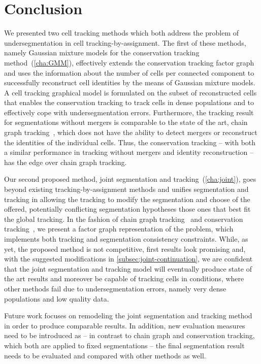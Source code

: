 \chapter{Conclusion}
\label{cha:conclusion}
We presented two cell tracking methods which both address the problem of undersegmentation in cell
tracking-by-assignment. The first of these methods, namely Gaussian mixture models for the
conservation tracking method~(\cref{cha:GMM}), effectively extends the conservation tracking factor
graph and uses the information about the number of cells per connected component to successfully
reconstruct cell identities by the means of Gaussian mixture models. A cell tracking graphical model
is formulated on the subset of reconstructed cells that enables the conservation tracking to track
cells in dense populations and to effectively cope with undersegmentation errors. Furthermore, the
tracking result for segmentations without mergers is comparable to the state of the art, chain graph
tracking~\citep{kausler_12_discrete}, which does not have the ability to detect mergers or
reconstruct the identities of the individual cells. Thus, the conservation tracking -- with both a
similar performance in tracking without mergers and identity reconstruction -- has the edge over
chain graph tracking.

Our second proposed method, joint segmentation and tracking~(\cref{cha:joint}), goes beyond existing
tracking-by-assignment methods and unifies segmentation and tracking in allowing the tracking to
modify the segmentation and choose of the offered, potentially conflicting segmentation hypotheses
those ones that best fit the global tracking. In the fashion of chain graph
tracking~\citep{kausler_12_discrete} and conservation tracking~\citep{schiegg_13_conservation}, we
present a factor graph representation of the problem, which implements both tracking and
segmentation consistency constraints. While, as yet, the proposed method is not competitive, first
results look promising and, with the suggested modifications in \cref{subsec:joint-continuation}, we
are confident that the joint segmentation and tracking model will eventually produce state of the
art results and moreover be capable of tracking cells in conditions, where other methods fail due to
undersegmentation errors, namely very dense populations and low quality data.

Future work focuses on remodeling the joint segmentation and tracking method in order to produce
comparable results. In addition, new evaluation measures need to be introduced as -- in contrast to
chain graph and conservation tracking, which both are applied to fixed segmentations -- the final
segmentation result needs to be evaluated and compared with other methods as well.


